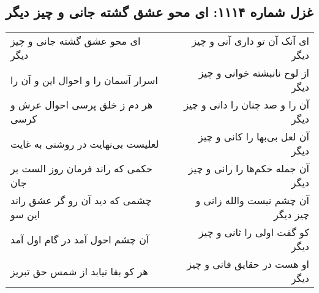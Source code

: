 \begin{center}
\section*{غزل شماره ۱۱۱۴: ای محو عشق گشته جانی و چیز دیگر}
\label{sec:1114}
\begin{longtable}{l p{0.5cm} r}
ای محو عشق گشته جانی و چیز دیگر
&&
ای آنک آن تو داری آنی و چیز دیگر
\\
اسرار آسمان را و احوال این و آن را
&&
از لوح نانبشته خوانی و چیز دیگر
\\
هر دم ز خلق پرسی احوال عرش و کرسی
&&
آن را و صد چنان را دانی و چیز دیگر
\\
لعلیست بی‌نهایت در روشنی به غایت
&&
آن لعل بی‌بها را کانی و چیز دیگر
\\
حکمی که راند فرمان روز الست بر جان
&&
آن جمله حکم‌ها را رانی و چیز دیگر
\\
چشمی که دید آن رو گر عشق راند این سو
&&
آن چشم نیست والله زانی و چیز دیگر
\\
آن چشم احول آمد در گام اول آمد
&&
کو گفت اولی را ثانی و چیز دیگر
\\
هر کو بقا نیابد از شمس حق تبریز
&&
او هست در حقایق فانی و چیز دیگر
\\
\end{longtable}
\end{center}
